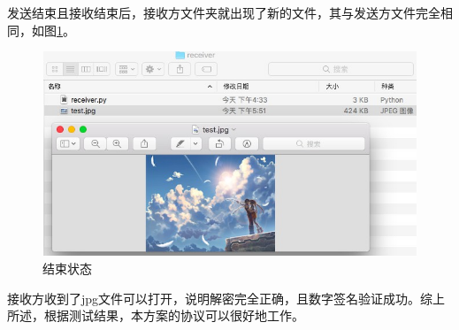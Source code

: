 \documentclass[11pt]{ctexart}
\begin{document}
发送结束且接收结束后，接收方文件夹就出现了新的文件，其与发送方文件完全相同，如图\ref{img_rcv}。

\begin{figure}[htbp]
\centering
\includegraphics[width=12.98cm, height=6.12cm]{receive.jpg}
\caption{结束状态}
\label{img_rcv}
\end{figure}

接收方收到了jpg文件可以打开，说明解密完全正确，且数字签名验证成功。综上所述，根据测试结果，本方案的协议可以很好地工作。
\end{document}
